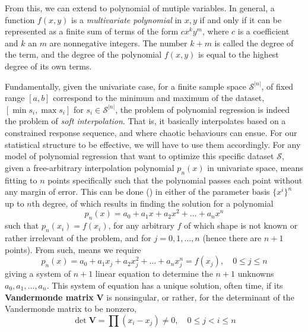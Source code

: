 \documentclass[10pt]{article} %
\begin{document}
From this, we can extend to polynomial of mutiple variables. In general, a function $f(x,y)$ is a \textit{multivariate polynomial} in $x,y$ if and only if it can be represented as a finite sum of terms of the form $cx^{k}y^{m}$, where $c$ is a coefficient and $k$ an $m$ are nonnegative integers. The number $k+m$ is called the degree of the term, and the degree of the polynomial $f(x,y)$ is equal to the highest degree of its own terms.

Fundamentally, given the univariate case, for a finite sample space $\mathcal{S}^{\lvert n\rvert}$, of fixed range $[a,b]$ correspond to the minimum and maximum of the dataset, $[\min s_{i},\max s_{i}]$ for $s_{i}\in \mathcal{S}^{\lvert n\rvert}$, the problem of polynomial regression is indeed the problem of \textit{soft interpolation}. That is, it basically interpolates based on a constrained response sequence, and where chaotic behaviours can ensue. For our statistical structure to be effective, we will have to use them accordingly. For any model of polynomial regression that want to optimize this specific dataset $\mathcal{S}$, given a free-arbitrary interpolation polynomial $p_{n}(x)$ in univariate space, means fitting to $n$ points specifically such that the polynomial passes each point without any margin of error. This can be done (\cite{McArtneyInterpolation2003}) in either of the parameter basis $\{x^{i}\}^{n}$ up to $n$th degree, of which results in finding the solution for a polynomial 
\begin{equation}
    p_{n}(x) = a_{0} + a_{1} x + a_{2} x^{2} + \dots + a_{n}x^{n} 
\end{equation}
such that $p_{n}(x_{i})=f(x_{i})$, for any arbitrary $f$ of which shape is not known or rather irrelevant of the problem, and for $j=0,1,\dots,n$ (hence there are $n+1$ points). From such, means we require 
\begin{equation}
    p_{n}(x) = a_{0} + a_{1} x_{j} + a_{2} x^{2}_{j} + \dots + a_{n}x^{n}_{j} = f(x_{j}), \quad 0 \leq j \leq n 
\end{equation}
giving a system of $n+1$ linear equation to determine the $n+1$ unknowns $a_{0},a_{1},\dots,a_{n}$. This system of equation has a unique solution, often time, if its \textbf{Vandermonde matrix} $\mathbf{V}$ is nonsingular, or rather, for the determinant of the Vandermonde matrix to be nonzero, \begin{equation}
    \det{\mathbf{V}} = \prod (x_{i}-x_{j}) \ne 0 , \quad 0 \leq j < i \leq n 
\end{equation}
\end{document}
